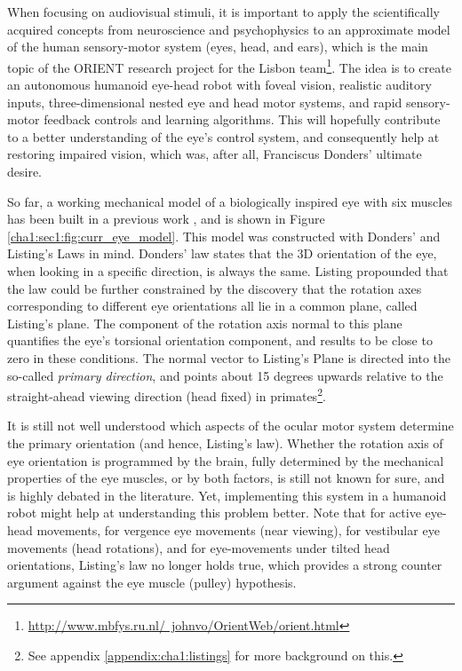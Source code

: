When focusing on audiovisual stimuli, it is important to apply the scientifically acquired concepts from neuroscience and psychophysics to an approximate model of the human sensory-motor system (eyes, head, and ears), which is the main topic of the ORIENT research project for the Lisbon team\footnote{\href{http://www.mbfys.ru.nl/~johnvo/OrientWeb/orient.html}{http://www.mbfys.ru.nl/~johnvo/OrientWeb/orient.html}}. 
The idea is to create an autonomous humanoid eye-head robot with foveal vision, realistic auditory inputs, three-dimensional nested eye and head motor systems, and rapid sensory-motor feedback controls and learning algorithms. This will hopefully contribute to a better understanding of the eye's control system, and consequently help at restoring impaired vision, which was, after all, Franciscus Donders' ultimate desire. 

So far, a working mechanical model of a biologically inspired eye with six muscles has been built in a previous work \cite{tesemiguel}, and is shown in Figure \ref{cha1:sec1:fig:curr_eye_model}. This model was constructed with Donders' and Listing's Laws in mind. Donders' law states that the 3D orientation of the eye, when looking in a specific direction, is always the same. Listing propounded that the law could be further constrained by the discovery that the rotation axes corresponding to different eye orientations  all lie in a common plane, called Listing's plane. The component of the rotation axis normal to this plane quantifies the eye's torsional orientation component, and results to be close to zero in these conditions. The normal vector to Listing’s Plane is directed into the so-called \textit{primary direction}, and points about 15 degrees upwards relative to the straight-ahead viewing direction (head fixed) in primates\footnote{See appendix \ref{appendix:cha1:listings} for more background on this.}. 

It is still not well understood which aspects of the ocular motor system determine the primary orientation (and hence, Listing's law). Whether the rotation axis of eye orientation is programmed by the brain, fully determined by the mechanical properties of the eye muscles, or by both factors, is still not known for sure, and is highly debated in the literature. Yet, implementing this system in a humanoid robot might help at understanding this problem better. Note that for active eye-head movements, for vergence eye movements (near viewing), for vestibular eye movements (head rotations), and for eye-movements under tilted head orientations, Listing’s law no longer holds true, which provides a strong counter argument against the eye muscle (pulley) hypothesis. \cite{donders}

